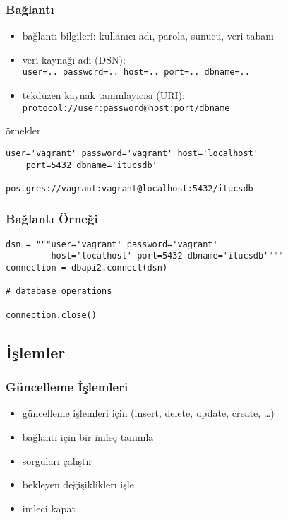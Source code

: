 \documentclass[dvipsnames]{beamer}
\theoremstyle{plain}
\begin{document}
\begin{frame}[fragile]
  \frametitle{Bağlantı}

  \begin{itemize}
    \item bağlantı bilgileri: kullanıcı adı, parola, sunucu, veri tabanı

    \medskip
    \item veri kaynağı adı (DSN):\\
      \texttt{user=.. password=.. host=.. port=.. dbname=..}
    \item tekdüzen kaynak tanımlayıcısı (URI):\\
      \texttt{protocol://user:password@host:port/dbname}
  \end{itemize}

  \medskip
  \begin{exampleblock}{örnekler}
    \begin{lstlisting}
user='vagrant' password='vagrant' host='localhost'
    port=5432 dbname='itucsdb'

postgres://vagrant:vagrant@localhost:5432/itucsdb
    \end{lstlisting}
  \end{exampleblock}
\end{frame}

\begin{frame}[fragile]
  \frametitle{Bağlantı Örneği}

  \begin{lstlisting}
dsn = """user='vagrant' password='vagrant'
         host='localhost' port=5432 dbname='itucsdb'"""
connection = dbapi2.connect(dsn)

# database operations

connection.close()
  \end{lstlisting}
\end{frame}

\subsection{İşlemler}

\begin{frame}
  \frametitle{Güncelleme İşlemleri}

  \begin{itemize}
    \item güncelleme işlemleri için (insert, delete, update, create, \ldots)

    \bigskip
    \item bağlantı için bir imleç tanımla
    \item sorguları çalıştır
    \item bekleyen değişikliklerı işle
    \item imleci kapat
  \end{itemize}
\end{frame}
\end{document}
